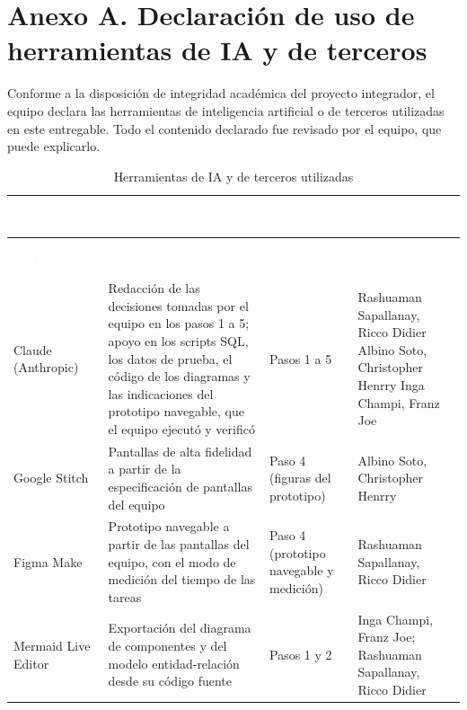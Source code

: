 \documentclass[11pt,a4paper]{article}
\newcommand{\cab}[1]{\textcolor{white}{\textbf{#1}}}
\begin{document}
\newpage
\section*{Anexo A. Declaración de uso de herramientas de IA y de terceros}

Conforme a la disposición de integridad académica del proyecto integrador, el equipo declara
las herramientas de inteligencia artificial o de terceros utilizadas en este entregable. Todo
el contenido declarado fue revisado por el equipo, que puede explicarlo.

\begin{xltabular}{\linewidth}{|P{3.1cm}|L|P{2.4cm}|P{3.7cm}|}
  \caption{Herramientas de IA y de terceros utilizadas}\label{tab:declaracion-ia}\\
  \hline
  \cab{Herramienta} & \cab{Uso que se le dio} & \cab{Parte del entregable} & \cab{Revisado por} \\ \hline
  \endfirsthead
  \hline
  \cab{Herramienta} & \cab{Uso que se le dio} & \cab{Parte del entregable} & \cab{Revisado por} \\ \hline
  \endhead
  Claude (Anthropic) & Redacción de las decisiones tomadas por el equipo en los pasos 1 a 5;
    apoyo en los scripts SQL, los datos de prueba, el código de los diagramas y las indicaciones
    del prototipo navegable, que el equipo ejecutó y verificó & Pasos 1 a 5 &
    Rashuaman Sapallanay, Ricco Didier \newline Albino Soto, Christopher Henrry \newline
    Inga Champi, Franz Joe \\ \hline
  Google Stitch & Pantallas de alta fidelidad a partir de la especificación de pantallas del
    equipo & Paso 4 (figuras del prototipo) & Albino Soto, Christopher Henrry \\ \hline
  Figma Make & Prototipo navegable a partir de las pantallas del equipo, con el modo de medición
    del tiempo de las tareas & Paso 4 (prototipo navegable y medición) &
    Rashuaman Sapallanay, Ricco Didier \\ \hline
  Mermaid Live Editor & Exportación del diagrama de componentes y del modelo entidad-relación
    desde su código fuente & Pasos 1 y 2 & Inga Champi, Franz Joe; Rashuaman Sapallanay, Ricco Didier \\ \hline
\end{xltabular}
\end{document}
